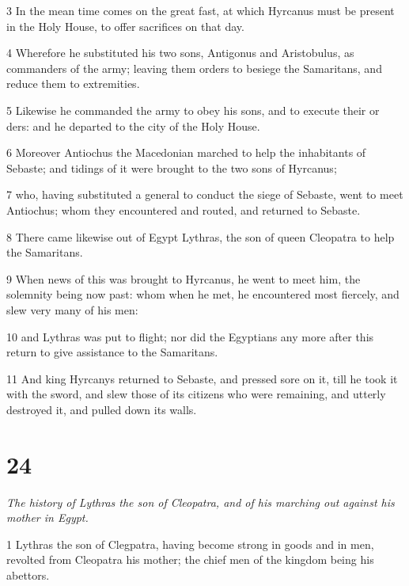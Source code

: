 \par 3 In the mean time comes on the great fast, at which Hyrcanus must be present in the Holy House, to offer sacrifices on that day. 

\par 4 Wherefore he substituted his two sons, Antigonus and Aristobulus, as commanders of the army; leaving them orders to besiege the Samaritans, and reduce them to extremities. 

\par 5 Likewise he commanded the army to obey his sons, and to execute their or ders: and he departed to the city of the Holy House.

\par 6 Moreover Antiochus the Macedonian marched to help the inhabitants of Sebaste; and tidings of it were brought to the two sons of Hyrcanus; 

\par 7 who, having substituted a general to conduct the siege of Sebaste, went to meet Antiochus; whom they encountered and routed, and returned to Sebaste. 

\par 8 There came likewise out of Egypt Lythras, the son of queen Cleopatra to help the Samaritans. 

\par 9 When news of this was brought to Hyrcanus, he went to meet him, the solemnity being now past: whom when he met, he encountered most fiercely, and slew very many of his men:

\par 10 and Lythras was put to flight; nor did the Egyptians any more after this return to give assistance to the Samaritans. 

\par 11 And king Hyrcanys returned to Sebaste, and pressed sore on it, till he took it with the sword, and slew those of its citizens who were remaining, and utterly destroyed it, and pulled down its walls. 

\chapter{24}

\par \textit{The history of Lythras the son of Cleopatra, and of his marching out against his mother in Egypt.}

\par 1 Lythras the son of Clegpatra, having become strong in goods and in men, revolted from Cleopatra his mother; the chief men of the kingdom being his abettors. 

